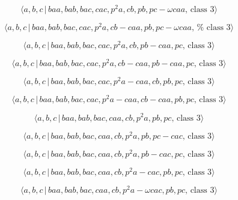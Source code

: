 \documentclass[10pt]{article}
\begin{document}
\begin{equation}
\langle a,b,c\,|\,baa,bab,bac,cac,p^{2}a,cb,pb,pc-\omega caa,\,\text{class }%
3\rangle  \tag{7.2674}
\end{equation}

\begin{equation}
\langle a,b,c\,|\,baa,bab,bac,cac,p^{2}a,cb-caa,pb,pc-\omega caa,\,\text{%
class }3\rangle  \tag{7.2675}
\end{equation}

\begin{equation}
\langle a,b,c\,|\,baa,bab,bac,cac,p^2a,cb,pb-caa,pc,\,\text{class }3\rangle 
\tag{7.2676}
\end{equation}

\begin{equation}
\langle a,b,c\,|\,baa,bab,bac,cac,p^2a,cb-caa,pb-caa,pc,\,\text{class }%
3\rangle  \tag{7.2677}
\end{equation}

\begin{equation}
\langle a,b,c\,|\,baa,bab,bac,cac,p^2a-caa,cb,pb,pc,\,\text{class }3\rangle 
\tag{7.2678}
\end{equation}

\begin{equation}
\langle a,b,c\,|\,baa,bab,bac,cac,p^2a-caa,cb-caa,pb,pc,\,\text{class }%
3\rangle  \tag{7.2679}
\end{equation}

\begin{equation}
\langle a,b,c\,|\,baa,bab,bac,caa,cb,p^2a,pb,pc,\,\text{class }3\rangle 
\tag{7.2680}
\end{equation}

\begin{equation}
\langle a,b,c\,|\,baa,bab,bac,caa,cb,p^2a,pb,pc-cac,\,\text{class }3\rangle 
\tag{7.2681}
\end{equation}

\begin{equation}
\langle a,b,c\,|\,baa,bab,bac,caa,cb,p^2a,pb-cac,pc,\,\text{class }3\rangle 
\tag{7.2682}
\end{equation}

\begin{equation}
\langle a,b,c\,|\,baa,bab,bac,caa,cb,p^2a-cac,pb,pc,\,\text{class }3\rangle 
\tag{7.2683}
\end{equation}

\begin{equation}
\langle a,b,c\,|\,baa,bab,bac,caa,cb,p^{2}a-\omega cac,pb,pc,\,\text{class }%
3\rangle  \tag{7.2684}
\end{equation}
\end{document}
